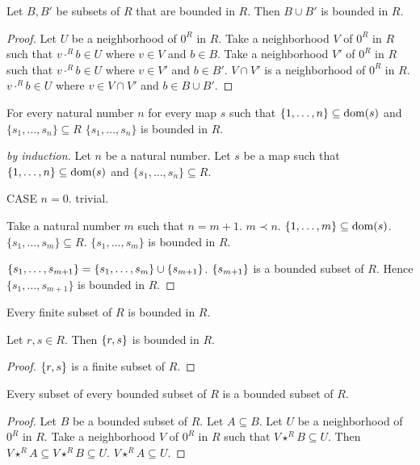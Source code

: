 \documentclass[11pt]{article}
\newcommand{\Seq}[2]{\{#1,\dots,#2\}}
\newcommand{\FinSet}[3]{\{#1_{#2},\dots,#1_{#3}\}}
\begin{document}
\begin{forthel}
\begin{lemma}
Let $B,B'$ be subsets of $R$ that are bounded in $R$.
Then $B \cup B'$ is bounded in $R$.
\end{lemma}
\begin{proof}
Let $U$ be a neighborhood of $0^{R}$ in $R$.
Take a neighborhood $V$ of $0^{R}$ in $R$ such that
$v \cdot^{R} b \in U$ where $v \in V$ and $b \in B$.
Take a neighborhood $V'$ of $0^{R}$ in $R$ such that
$v \cdot^{R} b \in U$ where $v \in V'$ and $b \in B'$.
$V \cap V'$ is a neighborhood of $0^{R}$ in $R$.
$v \cdot^{R} b \in U$ where $v \in V \cap V'$ and 
$b \in B \cup B'$.
\end{proof}

\begin{lemma} For every natural number $n$
for every map $s$ such that 
$\Seq{1}{n} \subseteq \dom(s)$ and $\FinSet{s}{1}{n} \subseteq R$
$\FinSet{s}{1}{n}$ is bounded in $R$.
\end{lemma}
\begin{proof}[by induction]
Let $n$ be a natural number.
Let $s$ be a map such that 
$\Seq{1}{n} \subseteq \dom(s)$ and $\FinSet{s}{1}{n} \subseteq R$.

CASE $n = 0$. trivial.

Take a natural number $m$ such that $n = m +1$. $m \prec n$.
$\Seq{1}{m} \subseteq \dom(s)$. $\FinSet{s}{1}{m} \subseteq R$.
$\FinSet{s}{1}{m}$ is bounded in $R$.

$\FinSet{s}{1}{m+1} = \FinSet{s}{1}{m} \cup \sing{s_{m+1}}$.
$\{s_{m+1}\}$ is a bounded subset of $R$.
Hence $\FinSet{s}{1}{m+1}$ is bounded in $R$.
\end{proof}

\begin{lemma}[5 28 1]
Every finite subset of $R$ is bounded in $R$.
\end{lemma}

\begin{lemma}
Let $r,s \in R$. Then $\{r,s\}$ is bounded in $R$.
\end{lemma}
\begin{proof}
$\{r,s\}$ is a finite subset of $R$.
\end{proof}

\begin{lemma}[L 136]
Every subset of every bounded subset of $R$ is a bounded subset of $R$.
\end{lemma}
\begin{proof}
Let $B$ be a bounded subset of $R$.
Let $A \subseteq B$.
Let $U$ be a neighborhood of $0^{R}$ in $R$.
Take a neighborhood $V$ of $0^{R}$ in $R$ such that $V \star^{R} B \subseteq U$.
Then $V \star^{R} A \subseteq V \star^{R} B \subseteq U$.
$V \star^{R} A \subseteq U$.
\end{proof}
\end{forthel}
\end{document}
